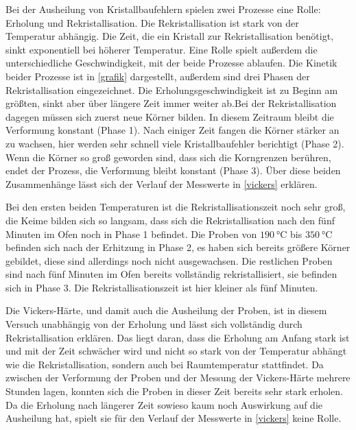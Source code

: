 \documentclass[
	a4paper,
	12pt,
	pagesize,
	ngerman
]{scrartcl}
\begin{document}
Bei der Ausheilung von Kristallbaufehlern spielen zwei Prozesse eine Rolle: Erholung und Rekristallisation. Die Rekristallisation ist stark von der Temperatur abhängig. Die Zeit, die ein Kristall zur Rekristallisation benötigt, sinkt exponentiell bei höherer Temperatur. Eine Rolle spielt außerdem die unterschiedliche Geschwindigkeit, mit der beide Prozesse ablaufen. Die Kinetik beider Prozesse ist in \cref{grafik} dargestellt, außerdem sind drei Phasen der Rekristallisation eingezeichnet. Die Erholungsgeschwindigkeit ist zu Beginn am größten, sinkt aber über längere Zeit immer weiter ab.Bei der Rekristallisation dagegen müssen sich zuerst neue Körner bilden. In diesem Zeitraum bleibt die Verformung konstant (Phase 1). Nach einiger Zeit fangen die Körner stärker an zu wachsen, hier werden sehr schnell viele Kristallbaufehler berichtigt (Phase 2). Wenn die Körner so groß geworden sind, dass sich die Korngrenzen berühren, endet der Prozess, die Verformung bleibt konstant (Phase 3). Über diese beiden Zusammenhänge lässt sich der Verlauf der Messwerte in \cref{vickers} erklären.

Bei den ersten beiden Temperaturen ist die Rekristallisationszeit noch sehr groß, die Keime bilden sich so langsam, dass sich die Rekristallisation nach den fünf Minuten im Ofen noch in Phase 1 befindet. Die Proben von $\SI{190}{\degreeCelsius}$ bis $\SI{350}{\degreeCelsius}$ befinden sich nach der Erhitzung in Phase 2, es haben sich bereits größere Körner gebildet, diese sind allerdings noch nicht ausgewachsen. Die restlichen Proben sind nach fünf Minuten im Ofen bereits vollständig rekristallisiert, sie befinden sich in Phase 3. Die Rekristallisationszeit ist hier kleiner als fünf Minuten.

Die Vickers-Härte, und damit auch die Ausheilung der Proben, ist in diesem Versuch unabhängig von der Erholung und lässt sich vollständig durch Rekristallisation erklären. Das liegt daran, dass die Erholung am Anfang stark ist und mit der Zeit schwächer wird und nicht so stark von der Temperatur abhängt wie die Rekristallisation, sondern auch bei Raumtemperatur stattfindet. Da zwischen der Verformung der Proben und der Messung der Vickers-Härte mehrere Stunden lagen, konnten sich die Proben in dieser Zeit bereits sehr stark erholen. Da die Erholung nach längerer Zeit sowieso kaum noch Auswirkung auf die Ausheilung hat, spielt sie für den Verlauf der Messwerte in \cref{vickers} keine Rolle.
\end{document}
